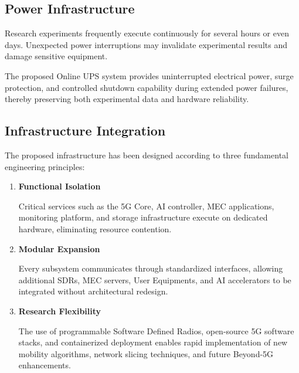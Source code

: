 \documentclass[12pt,a4paper]{article}\usepackage[a4paper,margin=1in]{geometry}\usepackage{graphicx}\usepackage{longtable}\usepackage{booktabs}\usepackage{hyperref}\usepackage{enumitem}\usepackage{amsmath}\usepackage{tikz}\usepackage{pgfgantt}\usepackage{setspace}\setstretch{1.15}\usetikzlibrary{positioning,arrows.meta,shapes.geometric}
\begin{document}
	
	\subsection{Power Infrastructure}
	
	Research experiments frequently execute continuously for several hours or even days. Unexpected power interruptions may invalidate experimental results and damage sensitive equipment.
	
	The proposed Online UPS system provides uninterrupted electrical power, surge protection, and controlled shutdown capability during extended power failures, thereby preserving both experimental data and hardware reliability.
	
	
	\subsection{Infrastructure Integration}
	
	The proposed infrastructure has been designed according to three fundamental engineering principles:
	
	\begin{enumerate}
		
		\item \textbf{Functional Isolation}
		
		Critical services such as the 5G Core, AI controller, MEC applications, monitoring platform, and storage infrastructure execute on dedicated hardware, eliminating resource contention.
		
		\item \textbf{Modular Expansion}
		
		Every subsystem communicates through standardized interfaces, allowing additional SDRs, MEC servers, User Equipments, and AI accelerators to be integrated without architectural redesign.
		
		\item \textbf{Research Flexibility}
		
		The use of programmable Software Defined Radios, open-source 5G software stacks, and containerized deployment enables rapid implementation of new mobility algorithms, network slicing techniques, and future Beyond-5G enhancements.
		
	\end{enumerate}
	
\end{document}

